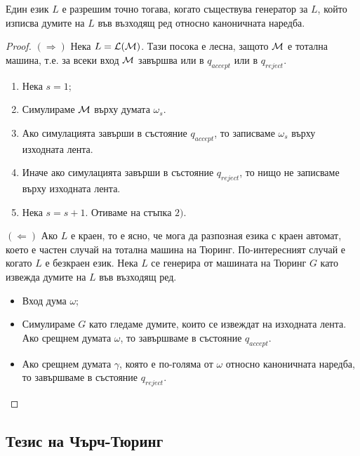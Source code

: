 \begin{framed}
  \begin{thm}
    Един език $L$ е разрешим точно тогава, когато съществува генератор за $L$, 
    който изписва думите на $L$ във възходящ ред относно каноничната наредба.
  \end{thm}
\end{framed}
\begin{proof}
  $(\Rightarrow)$ Нека $L = \mathcal{L}(\mathcal{M})$. Тази посока е лесна, защото $\mathcal{M}$ е тотална машина,
  т.е. за всеки вход $\mathcal{M}$ завършва или в $q_{accept}$ или в $q_{reject}$.
  \begin{enumerate}[1)]
  \item 
    Нека $s = 1$;
  \item
    Симулираме $\mathcal{M}$ върху думата $\omega_s$.
  \item
    Ако симулацията завърши в състояние $q_{accept}$, то записваме $\omega_s$
    върху изходната лента. 
  \item
    Иначе ако симулацията завърши в състояние $q_{reject}$, то нищо не записваме върху изходната лента. 
  \item
    Нека $s = s+1$. Отиваме на стъпка $2)$.
  \end{enumerate}

  $(\Leftarrow)$ Ако $L$ е краен, то е ясно, че мога да разпозная езика с краен автомат, което е частен случай на тотална машина на Тюринг.
  По-интересният случай е когато $L$ е безкраен език.
  Нека $L$ се генерира от машината на Тюринг $G$ като извежда думите на $L$ във възходящ ред.
  \begin{itemize}
  \item 
    Вход дума $\omega$;
  \item
    Симулираме $G$ като гледаме думите, които се извеждат на изходната лента.
    Ако срещнем думата $\omega$, то завършваме в състояние $q_{accept}$.
  \item
    Ако срещнем думата $\gamma$, която е по-голяма от $\omega$ относно каноничната наредба, 
    то завършваме в състояние $q_{reject}$.
  \end{itemize}
\end{proof}




\subsection*{Тезис на Чърч-Тюринг}

